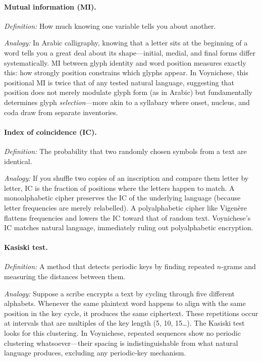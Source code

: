 \documentclass[11pt,a4paper]{article}
\begin{document}
\paragraph{Mutual information (MI).}
\textit{Definition:} How much knowing one variable tells you about another.

\textit{Analogy:} In Arabic calligraphy, knowing that a letter sits at the beginning of a word tells you a great deal about its shape---initial, medial, and final forms differ systematically.  MI between glyph identity and word position measures exactly this: how strongly position constrains which glyphs appear.  In Voynichese, this positional MI is twice that of any tested natural language, suggesting that position does not merely modulate glyph form (as in Arabic) but fundamentally determines glyph \textit{selection}---more akin to a syllabary where onset, nucleus, and coda draw from separate inventories.

\paragraph{Index of coincidence (IC).}
\textit{Definition:} The probability that two randomly chosen symbols from a text are identical.

\textit{Analogy:} If you shuffle two copies of an inscription and compare them letter by letter, IC is the fraction of positions where the letters happen to match.  A monoalphabetic cipher preserves the IC of the underlying language (because letter frequencies are merely relabelled).  A polyalphabetic cipher like Vigen\`ere flattens frequencies and lowers the IC toward that of random text.  Voynichese's IC matches natural language, immediately ruling out polyalphabetic encryption.

\paragraph{Kasiski test.}
\textit{Definition:} A method that detects periodic keys by finding repeated $n$-grams and measuring the distances between them.

\textit{Analogy:} Suppose a scribe encrypts a text by cycling through five different alphabets.  Whenever the same plaintext word happens to align with the same position in the key cycle, it produces the same ciphertext.  These repetitions occur at intervals that are multiples of the key length (5, 10, 15\ldots).  The Kasiski test looks for this clustering.  In Voynichese, repeated sequences show no periodic clustering whatsoever---their spacing is indistinguishable from what natural language produces, excluding any periodic-key mechanism.
\end{document}

